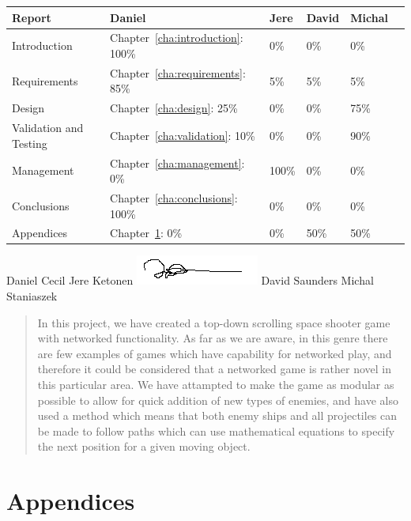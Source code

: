 \documentclass[10pt]{report}
\begin{document}
\begin{center}
  \begin{tabular}{|l||l|l|l|l|l|}\hline
    \textbf{Report} & \textbf{Daniel} & \textbf{Jere} & \textbf{David}
    & \textbf{Michal}\\\hline\hline
    Introduction & Chapter~\ref{cha:introduction}: 100\% & 0\% & 0\% & 0\%\\\hline
    Requirements & Chapter~\ref{cha:requirements}: 85\% & 5\% & 5\% & 5\%\\\hline
    Design & Chapter~\ref{cha:design}: 25\% & 0\% & 0\% & 75\%\\\hline
    Validation and Testing & Chapter~\ref{cha:validation}: 10\% & 0\% & 0\% & 90\%\\\hline
    Management & Chapter~\ref{cha:management}: 0\% & 100\% & 0\% & 0\%\\\hline
    Conclusions & Chapter~\ref{cha:conclusions}: 100\% & 0\% & 0\% & 0\%\\\hline
    Appendices & Chapter~\ref{cha:appendices}: 0\% & 0\% & 50\% & 50\%\\\hline
  \end{tabular}\vskip 1cm
  Daniel Cecil \vskip 1.4cm
  Jere Ketonen \vskip 0.1cm
  \includegraphics{jeresign.png}\vskip 0.2cm
  David Saunders \vskip 1.4cm
  Michal Staniaszek
  \end{center}

\begin{abstract}
  In this project, we have created a top-down scrolling space shooter
  game with networked functionality. As far as we are aware, in this
  genre there are few examples of games which have capability for
  networked play, and therefore it could be considered that a
  networked game is rather novel in this particular area. We have
  attampted to make the game as modular as possible to allow for quick
  addition of new types of enemies, and have also used a method which
  means that both enemy ships and all projectiles can be made to
  follow paths which can use mathematical equations to specify the
  next position for a given moving object.\end{abstract}




\chapter{Appendices}
\label{cha:appendices}


 
\end{document}
